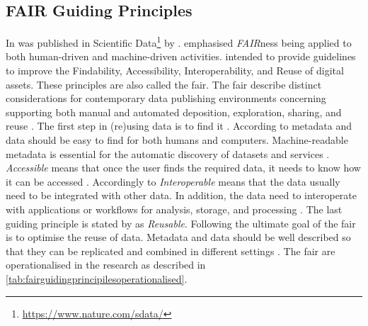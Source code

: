 \subsection{FAIR Guiding Principles}
\label{sub:fairguidingprinciples}
In \citeyear{Wilkinson2016}  was published in Scientific Data\footnote{\url{https://www.nature.com/sdata/}} by \citeauthor{Wilkinson2016}. \textcite[p.~3]{Wilkinson2016} emphasised \textit{FAIR}ness being applied to both human-driven and machine-driven activities. \textcite[Box 2]{Wilkinson2016} intended to provide guidelines to improve the Findability, Accessibility, Interoperability, and Reuse of digital assets. These principles are also called the \gls{fair}. The \gls{fair} describe distinct considerations for contemporary data publishing environments concerning supporting both manual and automated deposition, exploration, sharing, and reuse \textcite[p.~4]{Wilkinson2016}. The first step in (re)using data is to find it \parencite[p.~1]{GOFAIR2017}. According to \textcite[p.~1]{GOFAIR2017} metadata and data should be easy to find for both humans and computers. Machine-readable metadata is essential for the automatic discovery of datasets and services \parencite[p.~1]{GOFAIR2017}. \textit{Accessible} means that once the user finds the required data, it needs to know how it can be accessed \parencite[p.~1]{GOFAIR2017}. Accordingly to \textcite[p.~2]{GOFAIR2017} \textit{Interoperable} means that the data usually need to be integrated with other data. In addition, the data need to interoperate with applications or workflows for analysis, storage, and processing \parencite[p.~2]{GOFAIR2017}. The last guiding principle is stated by \textcite[p.~2]{GOFAIR2017} as \textit{Reusable}. Following \textcite[p.~2]{GOFAIR2017} the ultimate goal of the \gls{fair} is to optimise the reuse of data. Metadata and data should be well described so that they can be replicated and combined in different settings \parencite[p.~2]{GOFAIR2017}. The \gls{fair} are operationalised in the research as described in \cref{tab:fairguidingprincipilesoperationalised}.
